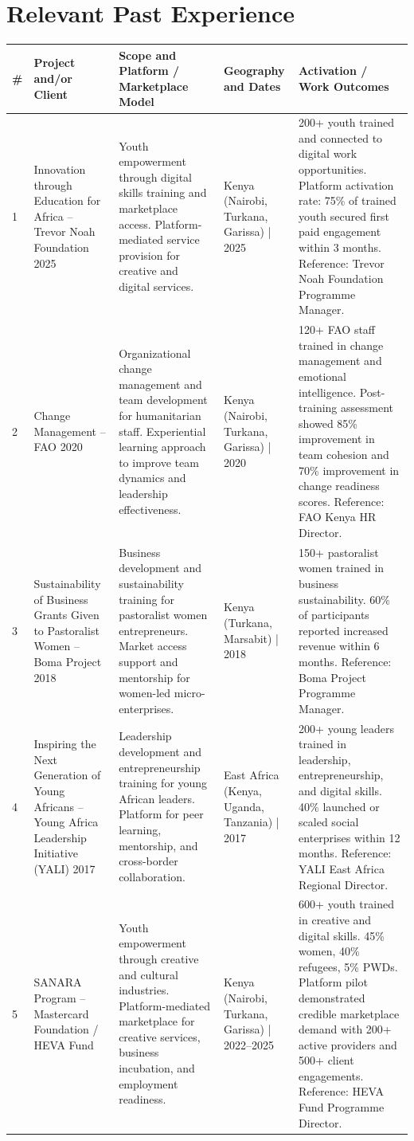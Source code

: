\documentclass[11pt,a4paper]{article}
\begin{document}
\section{Relevant Past Experience}
\begin{longtable}{@{}p{2cm}p{4cm}p{4cm}p{3cm}p{3cm}@{}}
\textbf{\#} & \textbf{Project and/or Client} & \textbf{Scope and Platform / Marketplace Model} & \textbf{Geography and Dates} & \textbf{Activation / Work Outcomes} \\
\hline
1 & Innovation through Education for Africa -- Trevor Noah Foundation 2025 & Youth empowerment through digital skills training and marketplace access. Platform-mediated service provision for creative and digital services. & Kenya (Nairobi, Turkana, Garissa) | 2025 & 200+ youth trained and connected to digital work opportunities. Platform activation rate: 75\% of trained youth secured first paid engagement within 3 months. Reference: Trevor Noah Foundation Programme Manager. \\
\hline
2 & Change Management -- FAO 2020 & Organizational change management and team development for humanitarian staff. Experiential learning approach to improve team dynamics and leadership effectiveness. & Kenya (Nairobi, Turkana, Garissa) | 2020 & 120+ FAO staff trained in change management and emotional intelligence. Post-training assessment showed 85\% improvement in team cohesion and 70\% improvement in change readiness scores. Reference: FAO Kenya HR Director. \\
\hline
3 & Sustainability of Business Grants Given to Pastoralist Women -- Boma Project 2018 & Business development and sustainability training for pastoralist women entrepreneurs. Market access support and mentorship for women-led micro-enterprises. & Kenya (Turkana, Marsabit) | 2018 & 150+ pastoralist women trained in business sustainability. 60\% of participants reported increased revenue within 6 months. Reference: Boma Project Programme Manager. \\
\hline
4 & Inspiring the Next Generation of Young Africans -- Young Africa Leadership Initiative (YALI) 2017 & Leadership development and entrepreneurship training for young African leaders. Platform for peer learning, mentorship, and cross-border collaboration. & East Africa (Kenya, Uganda, Tanzania) | 2017 & 200+ young leaders trained in leadership, entrepreneurship, and digital skills. 40\% launched or scaled social enterprises within 12 months. Reference: YALI East Africa Regional Director. \\
\hline
5 & SANARA Program -- Mastercard Foundation / HEVA Fund & Youth empowerment through creative and cultural industries. Platform-mediated marketplace for creative services, business incubation, and employment readiness. & Kenya (Nairobi, Turkana, Garissa) | 2022--2025 & 600+ youth trained in creative and digital skills. 45\% women, 40\% refugees, 5\% PWDs. Platform pilot demonstrated credible marketplace demand with 200+ active providers and 500+ client engagements. Reference: HEVA Fund Programme Director. \\
\end{longtable}
\end{document}
